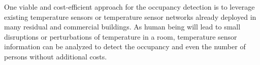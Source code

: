 One viable and cost-efficient  approach for the occupancy detection is to leverage
existing temperature sensors or temperature sensor networks already
deployed in many residual and commercial buildings. As human being
will lead to small disruptions or perturbations of temperature in a
room, temperature sensor information can be analyzed to detect the
occupancy and even the number of persons without additional costs.



